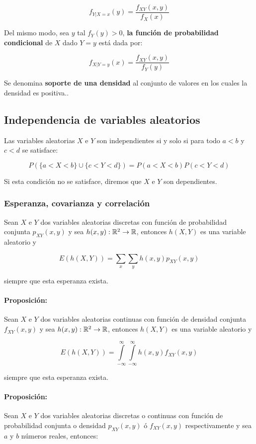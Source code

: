 $$f_{Y | X = x}(y) = \frac{f_{XY}(x,y)}{f_X(x)}$$

Del mismo modo, sea $y$ tal $f_Y(y) > 0$, \textbf{la función de probabilidad condicional} de $X$ dado $Y = y$ está dada por:

$$f_{X | Y = y}(x) = \frac{f_{XY}(x,y)}{f_Y(y)}$$

Se denomina \textbf{soporte de una densidad} al conjunto de valores en los cuales la densidad es positiva..
\subsection{Independencia de variables aleatorios}
Las variables aleatorias $X$ e $Y$ son independientes si y solo si para todo $a < b$ y $c < d$ se satisface:

$$P(\{a < X < b\}\cup \{ c < Y < d\}) = P(a < X < b)P(c < Y < d)$$

Si esta condición no se satisface, diremos que $X$ e $Y$ son dependientes.

\subsubsection{Esperanza, covarianza y correlación}
Sean $X$ e $Y$ dos variables aleatorias discretas con función de probabilidad conjunta $p_{XY}(x,y)$ y sea $h(x,y):\mathbb{R}^2\to\mathbb{R}$, entonces $h(X,Y)$ es una variable aleatorio y 

$$E(h(X,Y)) = \sum_x\sum_y h(x,y)p_{XY}(x,y)$$

siempre que esta esperanza exista.

\paragraph{Proposición:}Sean $X$ e $Y$ dos variables aleatorias continuas con función de densidad conjunta \\ $f_{XY}(x,y)$ y sea $h(x,y):\mathbb{R}^2\to\mathbb{R}$, entonces $h(X,Y)$ es una variable aleatorio y 

$$E(h(X,Y)) = \int\limits_{-\infty}^{\infty}\int\limits_{-\infty}^{\infty} h(x,y)f_{XY}(x,y)$$

siempre que esta esperanza exista.

\paragraph{Proposición:} Sean $X$ e $Y$ dos variables aleatorias discretas o continuas con función de probabilidad conjunta o densidad $p_{XY}(x,y)$ ó $f_{XY}(x,y)$ respectivamente y sea $a$ y $b$ números reales, entonces:

